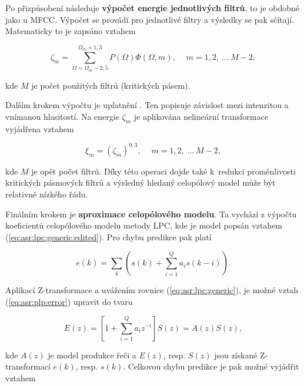 Po přizpůsobení následuje \textbf{výpočet energie jednotlivých filtrů}, to je obdobné jako u MFCC. Výpočet se provádí pro jednotlivé filtry a výsledky se pak sčítají. Matematicky to je zapsáno vztahem

\begin{equation}
  \zeta_m = \sum_{\Omega = \Omega_m - 2,5}^{\Omega_m + 1,3} P\left(\Omega\right)\Phi\left(\Omega, m\right), \quad\ m=1, 2,\ \dots\ M - 2,
  \label{eq:asr:plp:energy}
\end{equation}

\noindent kde $M$ je počet použitých filtrů (kritických pásem).

Dalším krokem výpočtu je uplatnění \textbf{}. Ten popisuje závislost mezi intenzitou a vnímanou hlasitostí. Na energie $\zeta_m$ je aplikována nelineární transformace vyjádřena vztahem

\begin{equation}
  \xi_m = \left(\zeta_m\right)^{0,3}, \quad\ m = 1, 2,\ \dots\ M-2,
  \label{eq:asr:plp:energy:transform}
\end{equation}

\noindent kde $M$ je opět počet filtrů. Díky této operaci dojde také  k~redukci proměnlivosti  kritických pásmových filtrů a výsledný hledaný celopólový model může být relativně nízkého řádu.

Finálním krokem je \textbf{aproximace celopólového modelu}. Ta vychází z výpočtu koeficientů celopólového modelu metody LPC, kde je model popsán vztahem (\ref{eq:asr:lpc:generic:edited}). Pro chybu predikce pak platí

\begin{equation}
  e\left(k\right) = \sum_{k} \left(s\left(k\right) + \sum_{i=1}^{Q} a_i s\left(k - i\right)\right).
  \label{eq:asr:plp:error}
\end{equation}

\noindent Aplikací Z-transformace a uvážením rovnice (\ref{eq:asr:lpc:generic}), je možné vztah (\ref{eq:asr:plp:error}) upravit do tvaru

\begin{equation}
  E\left(z\right) = \left[1 + \sum_{i=1}^{Q} a_i z^{-i}\right] S\left(z\right) = A\left(z\right)S\left(z\right),
  \label{eq:asr:plp:error:transform}
\end{equation}

\noindent kde $A\left(z\right)$ je model produkce řeči a $E\left(z\right)$, resp. $S\left(z\right)$ jsou získané Z-transformací $e\left(k\right)$, resp. $s\left(k\right)$. Celkovou chybu predikce je pak možné vyjádřit vztahem

